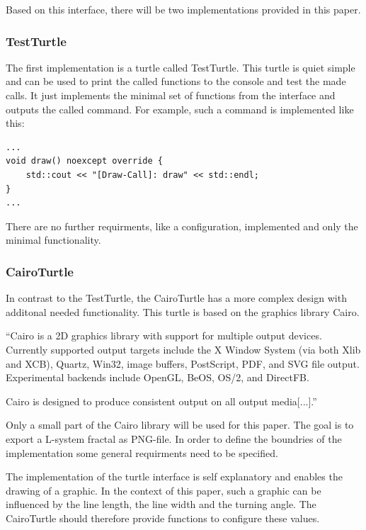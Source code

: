 \documentclass[english]{cpp-hmwk}
\begin{document}
\noindent Based on this interface, there will be two implementations provided in this paper. 

\subsubsection{TestTurtle}

The first implementation is a turtle called TestTurtle. This turtle is quiet simple and can be used to print the called functions to the console and test the made calls.
It just implements the minimal set of functions from the interface and outputs the called command. For example, such a command is implemented like this:

\medskip
\begin{lstlisting}
...
void draw() noexcept override {
    std::cout << "[Draw-Call]: draw" << std::endl;
}
...
\end{lstlisting}

There are no further requirments, like a configuration, implemented and only the minimal functionality.

\subsubsection{CairoTurtle}
In contrast to the TestTurtle, the CairoTurtle has a more complex design with additonal needed functionality. This turtle is based on the graphics library Cairo.


``Cairo is a 2D graphics library with support for multiple output devices. Currently supported output targets include the X Window System (via both Xlib and XCB), Quartz, Win32, image buffers, PostScript, PDF, and SVG file output. Experimental backends include OpenGL, BeOS, OS/2, and DirectFB.

Cairo is designed to produce consistent output on all output media[...].''\cite[Cf.]{cairohp}


\noindent Only a small part of the Cairo library will be used for this paper. The goal is to export a L-system fractal as PNG-file. In order to define the boundries of the implementation some general requirments need to be specified.

The implementation of the turtle interface is self explanatory and enables the drawing of a graphic. In the context of this paper, such a graphic can be influenced by the line length, the line width and the turning angle. The CairoTurtle should therefore provide functions to configure these values.
\end{document}
